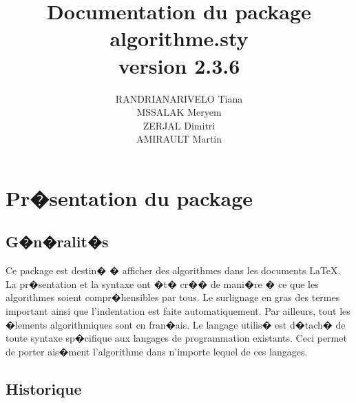 \documentclass[a4paper,12pt]{report}
\title{Documentation du package  algorithme.sty \\version 2.3.6}
\author{RANDRIANARIVELO Tiana \\ MSSALAK Meryem \\ ZERJAL Dimitri \\ AMIRAULT Martin}
\begin{document}
\maketitle
\tableofcontents{}


\chapter{Pr�sentation du package}

\section{G�n�ralit�s}

Ce package est destin� � afficher des algorithmes dans les documents \LaTeX.
La pr�sentation et la syntaxe ont �t� cr�� de mani�re � ce que les algorithmes soient compr�hensibles par tous. 
Le surlignage en gras des termes important ainsi que l'indentation est faite automatiquement. Par ailleurs, tout les �lements algorithmiques sont en fran�ais.
Le langage utilis� est d�tach� de toute syntaxe sp�cifique aux langages de programmation existants. Ceci permet de porter ais�ment l'algorithme dans n'importe lequel de ces langages.



\section{Historique}
\end{document}
